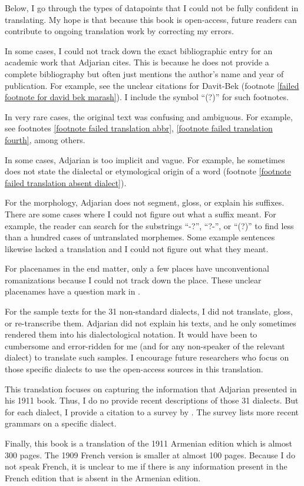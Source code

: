 \documentclass[output=paper]{langscibook}
\begin{document}
Below, I go through the types of datapoints that I could not  be fully confident in translating. My hope is that because this book is open-access,   future readers can contribute to ongoing translation work by correcting my errors. 

In some cases, I could not track down the exact bibliographic entry for an academic work that Adjarian cites. This is because he does not provide a complete bibliography but often just mentions the author's name and year of publication. For example, see the unclear     citations   for  Davit-Bek (footnote \ref{failed footnote for david bek marash}). I include the symbol ``(?)'' for such footnotes.

In very rare cases, the original text was confusing and ambiguous. For example, see footnotes \ref{footnote failed translation abbr}, \ref{footnote failed translation fourth},  among others.

In some cases, Adjarian is too implicit and vague. For example, he sometimes does not state the dialectal or etymological origin of  a word (footnote  \ref{footnote failed translation absent dialect}). 



For the morphology, Adjarian does not segment, gloss, or explain his suffixes. There are some cases where I could not figure out what a suffix meant. For    example, the reader can search for the substrings ``-?'',  ``?-'', or ``(?)'' to find less than a hundred cases of untranslated morphemes. Some example sentences likewise lacked a translation and I could not figure out what they meant.

For placenames in the end matter, only a few places have unconventional romanizations because I could not track down the place. These unclear placenames have a question mark in .

For the sample texts for the 31 non-standard dialects, I did not translate, gloss, or re-transcribe them. Adjarian did not   explain his texts, and he only sometimes rendered them into his dialectological notation. It would have been to cumbersome and error-ridden for me (and for any non-speaker of the relevant dialect) to translate such samples. I encourage future researchers who focus on those specific dialects to use the open-access sources in this translation. 

This translation focuses on capturing the information that Adjarian presented in his 1911 book. Thus, I do no provide recent descriptions of those 31 dialects. But for each dialect, I provide a citation to a survey by \citet{Martirosyan-2019-ArmenianDialectsBigVersionRussianJournal}. The survey lists more recent grammars on a specific dialect.  

Finally, this book is a translation of the 1911 Armenian edition which is almost 300 pages. The 1909 French version is smaller at almost 100 pages.   Because I do not speak French, it is unclear to me if there is any information present in the French edition that is absent in the Armenian edition. 

\printbibliography[heading=subbibliography]
\end{document}
